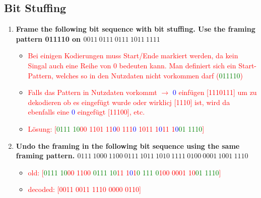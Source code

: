 \documentclass[a4paper,12pt]{article}
\begin{document}
	
	\subsection{Bit Stuffing}
	\begin{enumerate}[label=(\roman*),itemsep=0pt]
		\item \textbf{Frame the following bit sequence with bit stuffing. Use the framing pattern 011110 on $0011~0111~0111~1011~1111$}
		\begin{itemize}
			\item \textcolor{red}{Bei einigen Kodierungen muss Start/Ende markiert werden, da kein Singal auch eine Reihe von 0 bedeuten kann. Man definiert sich ein Start-Pattern, welches so in den Nutzdaten nicht vorkommen darf (\textcolor{green}{011110})}
			\item \textcolor{red}{Falls das Pattern in Nutzdaten vorkommt $\rightarrow$ \textcolor{blue}{0} einf\"ugen [1110111] um zu dekodieren ob es eingefügt wurde oder wirklicj [1110] ist, wird da ebenfalls eine \textcolor{blue}{0} eingefügt [11100], etc.}
			\item \textcolor{red}{Lösung: [\textcolor{green}{0111 10}00 1101 11\textcolor{blue}{0}0 111\textcolor{blue}{0} 1011 1\textcolor{blue}{0}11 1\textcolor{blue}{0}\textcolor{green}{01 1110}]}
		\end{itemize}
		\item \textbf{Undo the framing in the following bit sequence using the same framing pattern. $0111~1000~ 1100~ 0111~ 1011~ 1010~ 1111~ 0100~ 0001~ 1001~ 1110$}
		\begin{itemize}
			\item \textcolor{red}{old: [\textcolor{green}{0111 10}00 1100 \textcolor{green}{0111 10}11 1\textcolor{blue}{0}1\textcolor{green}{0 111 0}100 0001 10\textcolor{green}{01 1110}]}
			\item \textcolor{red}{decoded: [0011 0011 1110 0000 0110]}
		\end{itemize}
	\end{enumerate}
\end{document}

